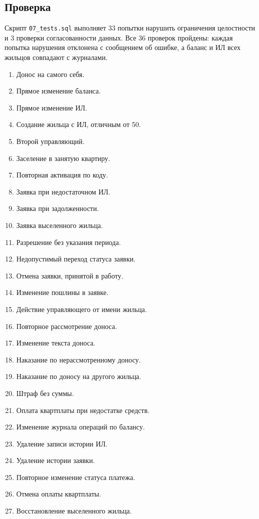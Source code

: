\documentclass[12pt,a4paper]{article}
\begin{document}
\subsection{Проверка}
Скрипт \texttt{07\_\allowbreak{}tests.sql} выполняет 33 попытки нарушить ограничения целостности и 3 проверки
согласованности данных. Все 36 проверок пройдены: каждая попытка нарушения отклонена с
сообщением об ошибке, а баланс и ИЛ всех жильцов совпадают с журналами.
\begin{enumerate}[label=\arabic*., itemsep=0pt]
\small
  \item Донос на самого себя.
  \item Прямое изменение баланса.
  \item Прямое изменение ИЛ.
  \item Создание жильца с ИЛ, отличным от 50.
  \item Второй управляющий.
  \item Заселение в занятую квартиру.
  \item Повторная активация по коду.
  \item Заявка при недостаточном ИЛ.
  \item Заявка при задолженности.
  \item Заявка выселенного жильца.
  \item Разрешение без указания периода.
  \item Недопустимый переход статуса заявки.
  \item Отмена заявки, принятой в работу.
  \item Изменение пошлины в заявке.
  \item Действие управляющего от имени жильца.
  \item Повторное рассмотрение доноса.
  \item Изменение текста доноса.
  \item Наказание по нерассмотренному доносу.
  \item Наказание по доносу на другого жильца.
  \item Штраф без суммы.
  \item Оплата квартплаты при недостатке средств.
  \item Изменение журнала операций по балансу.
  \item Удаление записи истории ИЛ.
  \item Удаление истории заявки.
  \item Повторное изменение статуса платежа.
  \item Отмена оплаты квартплаты.
  \item Восстановление выселенного жильца.

\end{enumerate}
\end{document}
